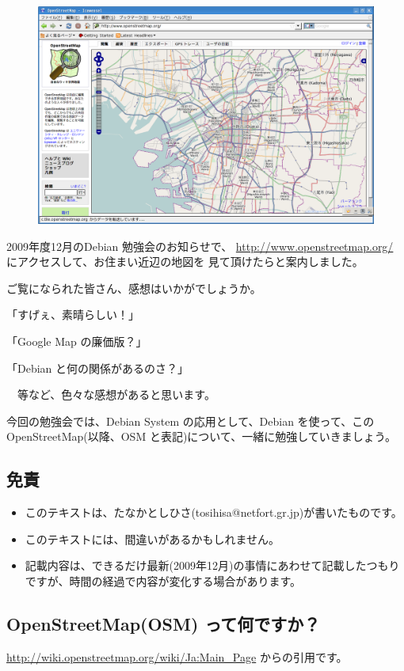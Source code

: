\documentclass[mingoth,a4paper]{jsarticle}
\begin{document}
\begin{figure}[h!]
    \centering
    \includegraphics[scale=0.3]{image200912/debianosm1.png}
\end{figure}

2009年度12月のDebian 勉強会のお知らせで、
\url{http://www.openstreetmap.org/} にアクセスして、お住まい近辺の地図を
見て頂けたらと案内しました。

ご覧になられた皆さん、感想はいかがでしょうか。

「すげぇ、素晴らしい！」

「Google Map の廉価版？」

「Debian と何の関係があるのさ？」

　等など、色々な感想があると思います。

今回の勉強会では、Debian System の応用として、Debian を使って、この
OpenStreetMap(以降、OSM と表記)について、一緒に勉強していきましょう。

\subsection{免責}
\begin{itemize}
 \item このテキストは、たなかとしひさ(tosihisa@netfort.gr.jp)が書いたものです。
 \item このテキストには、間違いがあるかもしれません。
 \item 記載内容は、できるだけ最新(2009年12月)の事情にあわせて記載したつもりですが、時間の経過で内容が変化する場合があります。
\end{itemize}

\subsection{OpenStreetMap(OSM) って何ですか？}
\url{http://wiki.openstreetmap.org/wiki/Ja:Main_Page} からの引用です。
\end{document}
